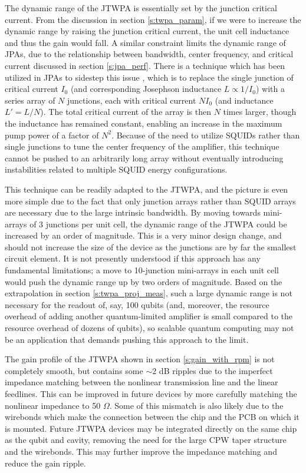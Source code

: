 The dynamic range of the JTWPA is essentially set by the junction critical current.  From the discussion in section \ref{s:twpa_param}, if we were to increase the dynamic range by raising the junction critical current, the unit cell inductance and thus the gain would fall.  A similar constraint limits the dynamic range of JPAs, due to the relationship between bandwidth, center frequency, and critical current discussed in section \ref{s:jpa_perf}.  There is a technique which has been utilized in JPAs to sidestep this issue \cite{Eichler2014a}, which is to replace the single junction of critical current $I_0$ (and corresponding Josephson inductance $L \propto 1/I_0$) with a series array of $N$ junctions, each with critical current $NI_0$ (and inductance $L' = L/N$).  The total critical current of the array is then $N$ times larger, though the inductance has remained constant, enabling an increase in the maximum pump power of a factor of $N^2$.  Because of the need to utilize SQUIDs rather than single junctions to tune the center frequency of the amplifier, this technique cannot be pushed to an arbitrarily long array without eventually introducing instabilities related to multiple SQUID energy configurations.

This technique can be readily adapted to the JTWPA, and the picture is even more simple due to the fact that only junction arrays rather than SQUID arrays are necessary due to the large intrinsic bandwidth.  By moving towards mini-arrays of 3 junctions per unit cell, the dynamic range of the JTWPA could be increased by an order of magnitude.  This is a very minor design change, and should not increase the size of the device as the junctions are by far the smallest circuit element.  It is not presently understood if this approach has any fundamental limitations; a move to 10-junction mini-arrays in each unit cell would push the dynamic range up by two orders of magnitude.  Based on the extrapolation in section \ref{s:twpa_proj_meas}, such a large dynamic range is not necessary for the readout of, say, 100 qubits (and, moreover, the resource overhead of adding another quantum-limited amplifier is small compared to the resource overhead of dozens of qubits), so scalable quantum computing may not be an application that demands pushing this approach to the limit.

The gain profile of the JTWPA shown in section \ref{s:gain_with_rpm} is not completely smooth, but contains some $\sim 2$ dB ripples due to the imperfect impedance matching between the nonlinear transmission line and the linear feedlines.  This can be improved in future devices by more carefully matching the nonlinear impedance to 50 $\Omega$.  Some of this mismatch is also likely due to the wirebonds which make the connection between the chip and the PCB on which it is mounted.  Future JTWPA devices may be integrated directly on the same chip as the qubit and cavity, removing the need for the large CPW taper structure and the wirebonds.  This may further improve the impedance matching and reduce the gain ripple.

